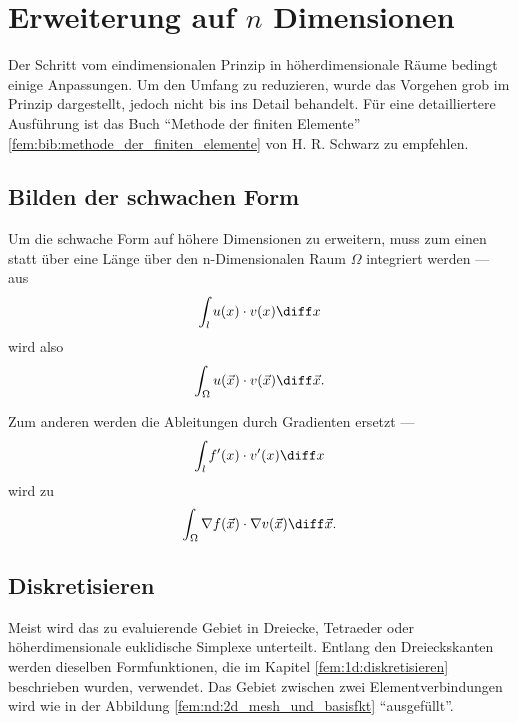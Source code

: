 %
%
%
%
\section{Erweiterung auf $n$ Dimensionen\label{fem:nD}}
Der Schritt vom eindimensionalen Prinzip in höherdimensionale Räume bedingt einige Anpassungen. 
Um den Umfang zu reduzieren, wurde das Vorgehen grob im Prinzip dargestellt, jedoch nicht bis ins Detail behandelt.
Für eine detailliertere Ausführung ist das Buch ``Methode der finiten Elemente'' \ref{fem:bib:methode_der_finiten_elemente} von H. R. Schwarz zu empfehlen.


\subsection{Bilden der schwachen Form}
Um die schwache Form auf höhere Dimensionen zu erweitern, muss zum einen statt über eine Länge über den n-Dimensionalen Raum $\Omega$ integriert werden --- aus 
\begin{equation}
    \int_{l} u(x) \cdot v(x) \diff x
\end{equation}
wird also
\begin{equation}
    \int_{\Omega} u(\vec{x}) \cdot v(\vec{x}) \diff \vec{x}.
\end{equation}

Zum anderen werden die Ableitungen durch Gradienten ersetzt ---
\begin{equation}
    \int_{l} f'(x) \cdot v'(x) \diff x
\end{equation}
wird zu
\begin{equation}
    \int_{\Omega} \nabla f(\vec{x}) \cdot \nabla v(\vec{x}) \diff \vec{x}.
\end{equation}


\subsection{Diskretisieren}
Meist wird das zu evaluierende Gebiet in Dreiecke, Tetraeder oder höherdimensionale euklidische Simplexe unterteilt. 
Entlang den Dreieckskanten werden dieselben Formfunktionen, die im Kapitel \ref{fem:1d:diskretisieren} beschrieben wurden, verwendet.
Das Gebiet zwischen zwei Elementverbindungen wird wie in der Abbildung \ref{fem:nd:2d_mesh_und_basisfkt} ``ausgefüllt''.



